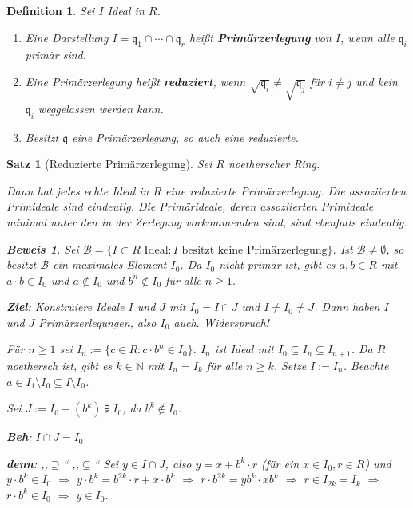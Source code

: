 \documentclass[a4paper,12pt]{scrbook}
\theoremstyle{break}
\newtheorem{Satz}{Satz}
\newtheorem{Def}{Definition}[chapter]
\theoremstyle{nonumberbreak}
\newtheorem{Bew}{Beweis}
\theoremstyle{nonumberplain}
\newcommand{\emp}[1]{\textbf{\emph{#1}}}
\begin{document}
\begin{Def}
Sei $I$ Ideal in $R$.

\begin{enumerate}
\item[a)] Eine Darstellung $I = \mathfrak{q}_1 \cap \cdots \cap \mathfrak{q}_r$ heißt \emp{Primärzerlegung} von $I$, wenn alle $\mathfrak{q}_i$ primär sind.

\item[b)] Eine Primärzerlegung heißt \emp{reduziert}, wenn $\sqrt{\mathfrak{q}_i} \neq \sqrt{\mathfrak{q}_j}$ für $i \neq j$ und kein $\mathfrak{q}_i$ weggelassen werden kann.

\item[c)] Besitzt $\mathfrak{q}$ eine Primärzerlegung, so auch eine reduzierte.
\end{enumerate}
\end{Def}

\begin{Satz}[Reduzierte Primärzerlegung]
Sei $R$ noetherscher Ring.

Dann hat jedes echte Ideal in $R$ eine reduzierte Primärzerlegung. Die assoziierten Primideale sind eindeutig. Die Primärideale, deren assoziierten Primideale minimal unter den in der Zerlegung vorkommenden sind, sind ebenfalls eindeutig.

\begin{Bew}
Sei $\mathcal{B} = \{ I \subset R \text{ Ideal} : I \text{ besitzt keine Primärzerlegung} \}$. Ist $\mathcal{B} \neq \emptyset$, so besitzt $\mathcal{B}$ ein maximales Element $I_0$. Da $I_0$ nicht primär ist, gibt es $a,b \in R$ mit $a \cdot b \in I_0$ und $a \notin I_0$ und $b^n \notin I_0$ für alle $n \geq 1$.

\textbf{Ziel}: Konstruiere Ideale $I$ und $J$ mit $I_0 = I \cap J$ und $I \neq I_0 \neq J$. Dann haben $I$ und $J$ Primärzerlegungen, also $I_0$ auch. Widerspruch!

Für $n \geq 1$ sei $I_n := \{ c \in R : c \cdot b^n \in I_0 \}$. $I_n$ ist Ideal mit $I_0 \subseteq I_n \subseteq I_{n+1}$. Da $R$ noethersch ist, gibt es $k \in \mathbb{N}$ mit $I_n = I_k$ für alle $n \geq k$. Setze $I := I_n$. Beachte $a \in I_1 \setminus I_0 \subseteq I \setminus I_0$.

Sei $J := I_0 + (b^k) \supsetneqq I_0$, da $b^k \notin I_0$.

\textbf{Beh}: $I \cap J = I_0$

\textbf{denn}: ,,$\supseteq$`` \checkmark ,,$\subseteq$`` Sei $y \in I \cap J$, also $y = x + b^k \cdot r$ (für ein $x \in I_0, r \in R$) und $y \cdot b^k \in I_0$ $\Rightarrow$ $y \cdot b^k = b^{2k} \cdot r + x \cdot b^k$ $\Rightarrow$ $r \cdot b^{2k} = y b^k \cdot x b^k$ $\Rightarrow$ $r \in I_{2k} = I_k$ $\Rightarrow$ $r \cdot b^k \in I_0$ $\Rightarrow$ $y \in I_0$.

\end{Bew}
\end{Satz}

\appendix

\def\indexspace{\par\medskip}
\end{document}
